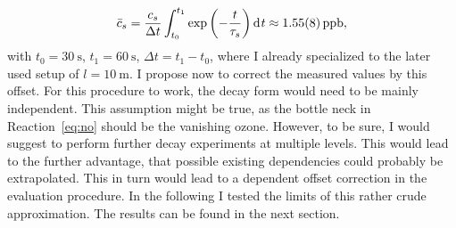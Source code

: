 \begin{align}
  \bar c_s = \frac{c_s}{\Delta t} \int_{t_0}^{t_1}
  \exp\left(-\frac{t}{\tau_s}\right)\d[t] \approx \SI{1.55(8)}{ppb},\label{eq:offset}
\end{align}
with $t_0 = \SI{30}{\second}$, $t_1 = \SI{60}{\second}$,
$\Delta t = t_1 - t_0$, where I already specialized to the later used
setup of $l = \SI{10}{\meter}$. I propose now to correct the measured
 values by this offset. For this procedure to work, the decay
form would need to be mainly  independent. This assumption
might be true, as the bottle neck in Reaction~\eqref{eq:no} should be
the vanishing ozone. However, to be sure, I would suggest to perform
further decay experiments at multiple  levels. This would lead
to the further advantage, that possible existing  dependencies
could probably be extrapolated. This in turn would lead to a 
dependent offset correction in the evaluation procedure.  In the
following I tested the limits of this rather crude approximation. The
results can be found in the next section.

